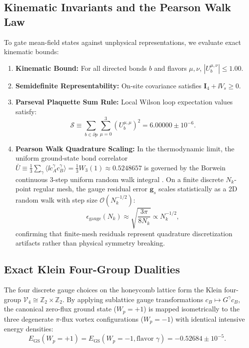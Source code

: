 \subsection{Kinematic Invariants and the Pearson Walk Law}
To gate mean-field states against unphysical representations, we evaluate exact kinematic bounds:
\begin{enumerate}
\item \textbf{Kinematic Bound:} For all directed bonds $b$ and flavors $\mu, \nu$, $|U_b^{\mu,\nu}| \le 1.00$.
\item \textbf{Semidefinite Representability:} On-site covariance satisfies $\mathbf{I}_4 + \ii V_s \ge 0$.
\item \textbf{Parseval Plaquette Sum Rule:} Local Wilson loop expectation values satisfy:
\begin{equation}
\label{eq:parseval_sum_rule}
\mathcal{S} \equiv \sum_{b \in \partial p} \sum_{\mu=0}^3 (U_b^{\mu,\mu})^2 = 6.00000 \pm 10^{-6}.
\end{equation}
\item \textbf{Pearson Walk Quadrature Scaling:} In the thermodynamic limit, the uniform ground-state bond correlator $\bar{U} \equiv \frac{1}{3}\sum_\gamma \langle \ii c_A^\gamma c_B^\gamma \rangle = \frac{1}{3} W_3(1) \approx 0.5248657$ is governed by the Borwein continuous 3-step uniform random walk integral \cite{Borwein2012}. On a finite discrete $N_k$-point regular mesh, the gauge residual error $\mathbf{g}_s$ scales statistically as a 2D random walk with step size $\mathcal{O}(N_k^{-1/2})$:
\begin{equation}
\label{eq:pearson_walk_scaling}
\epsilon_{\mathrm{gauge}}(N_k) \approx \sqrt{\frac{3\pi}{8 N_k}} \propto N_k^{-1/2},
\end{equation}
confirming that finite-mesh residuals represent quadrature discretization artifacts rather than physical symmetry breaking.
\end{enumerate}

\subsection{Exact Klein Four-Group Dualities}
The four discrete gauge choices on the honeycomb lattice form the Klein four-group $\mathcal{V}_4 \cong \mathbb{Z}_2 \times \mathbb{Z}_2$. By applying sublattice gauge transformations $c_B \mapsto G^\gamma c_B$, the canonical zero-flux ground state ($W_p = +1$) is mapped isometrically to the three degenerate $\pi$-flux vortex configurations ($W_p = -1$) with identical intensive energy densities:
\begin{equation}
\label{eq:klein_duality}
E_{\mathrm{GS}}(W_p = +1) = E_{\mathrm{GS}}(W_p = -1, \text{flavor } \gamma) = -0.52684 \pm 10^{-5}.
\end{equation}
